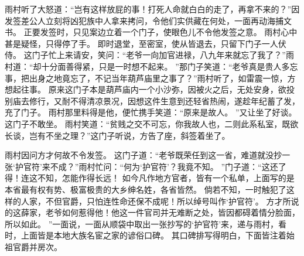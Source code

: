雨村听了大怒道：“岂有这样放屁的事！打死人命就白白的走了，再拿不来的？”因发签差公人立刻将凶犯族中人拿来拷问，令他们实供藏在何处，一面再动海捕文书。
正要发签时，只见案边立着一个门子，使眼色儿不令他发签之意。
雨村心中甚是疑怪，只得停了手。
即时退堂，至密室，使从皆退去，只留下门子一人伏侍。
这门子忙上来请安，笑问：“老爷一向加官进禄，八九年来就忘了我了？”雨村道：“却十分面善得紧，只是一时想不起来。
”那门子笑道：“老爷真是贵人多忘事，把出身之地竟忘了，不记当年葫芦庙里之事了？”雨村听了，如雷震一惊，方想起往事。
原来这门子本是葫芦庙内一个小沙弥，因被火之后，无处安身，欲投别庙去修行，又耐不得清凉景况，因想这件生意到还轻省热闹，遂趁年纪蓄了发，充了门子。
雨村那里料得是他，便忙携手笑道：“原来是故人。
”又让坐了好谈。
这门子不敢坐。
雨村笑道：“贫贱之交不可忘，你我故人也，二则此系私室，既欲长谈，岂有不坐之理？”这门子听说，方告了座，斜签着坐了。
\par
雨村因问方才何故不令发签。
这门子道：“老爷既荣任到这一省，难道就没抄一张‘护官符’来不成？”雨村忙问：“何为‘护官符’？我竟不知。
”门子道：“这还了得！连这不知，怎能作得长远！
如今凡作地方官者，皆有一个私单，上面写的是本省最有权有势、极富极贵的大乡绅名姓，各省皆然。
倘若不知，一时触犯了这样的人家，不但官爵，只怕连性命还保不成呢！所以绰号叫作‘护官符’。
方才所说的这薛家，老爷如何惹得他！他这一件官司并无难断之处，皆因都碍着情分脸面，所以如此。
”一面说，一面从顺袋中取出一张抄写的‘护官符’来，递与雨村，看时，上面皆是本地大族名宦之家的谚俗口碑。
其口碑排写得明白，下面皆注着始祖官爵并房次。

